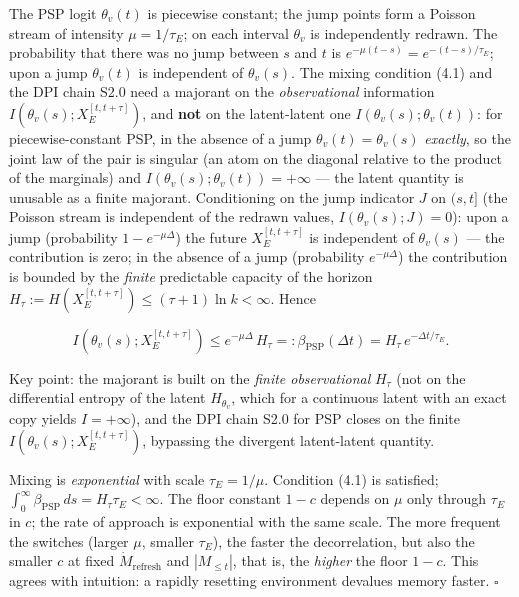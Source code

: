 \documentclass[12pt]{iopart}
\begin{document}
The PSP logit \(\theta_v(t)\) is piecewise constant; the jump points form a Poisson stream of intensity \(\mu = 1/\tau_E\); on each interval \(\theta_v\) is independently redrawn. The probability that there was no jump between \(s\) and \(t\) is \(e^{-\mu(t-s)} = e^{-(t-s)/\tau_E}\); upon a jump \(\theta_v(t)\) is independent of \(\theta_v(s)\). The mixing condition (4.1) and the DPI chain S2.0 need a majorant on the \emph{observational} information \(I(\theta_v(s); X_E^{[t,t+\tau]})\), and \textbf{not} on the latent-latent one \(I(\theta_v(s);\theta_v(t))\): for piecewise-constant PSP, in the absence of a jump \(\theta_v(t)=\theta_v(s)\) \emph{exactly}, so the joint law of the pair is singular (an atom on the diagonal relative to the product of the marginals) and \(I(\theta_v(s);\theta_v(t))=+\infty\) --- the latent quantity is unusable as a finite majorant. Conditioning on the jump indicator \(J\) on \((s,t]\) (the Poisson stream is independent of the redrawn values, \(I(\theta_v(s);J)=0\)): upon a jump (probability \(1-e^{-\mu\Delta}\)) the future \(X_E^{[t,t+\tau]}\) is independent of \(\theta_v(s)\) --- the contribution is zero; in the absence of a jump (probability \(e^{-\mu\Delta}\)) the contribution is bounded by the \emph{finite} predictable capacity of the horizon \(H_\tau := H(X_E^{[t,t+\tau]}) \le (\tau+1)\ln k < \infty\). Hence



\begin{equation}I(\theta_v(s); X_E^{[t,t+\tau]}) \le e^{-\mu\Delta}\,H_\tau =: \beta_{\text{PSP}}(\Delta t) = H_\tau\,e^{-\Delta t/\tau_E}. \tag{S2.3}\end{equation}



Key point: the majorant is built on the \emph{finite observational} \(H_\tau\) (not on the differential entropy of the latent \(H_{\theta_v}\), which for a continuous latent with an exact copy yields \(I=+\infty\)), and the DPI chain S2.0 for PSP closes on the finite \(I(\theta_v(s);X_E^{[t,t+\tau]})\), bypassing the divergent latent-latent quantity.



Mixing is \emph{exponential} with scale \(\tau_E = 1/\mu\). Condition (4.1) is satisfied; \(\int_0^\infty\beta_{\text{PSP}}\,ds = H_\tau\tau_E < \infty\). The floor constant \(1-c\) depends on \(\mu\) only through \(\tau_E\) in \(c\); the rate of approach is exponential with the same scale. The more frequent the switches (larger \(\mu\), smaller \(\tau_E\)), the faster the decorrelation, but also the smaller \(c\) at fixed \(\dot M_{\text{refresh}}\) and \(|M_{\le t}|\), that is, the \emph{higher} the floor \(1-c\). This agrees with intuition: a rapidly resetting environment devalues memory faster. \(\square\)
\end{document}
